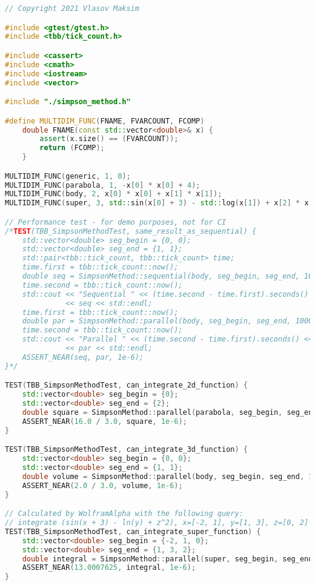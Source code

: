 \documentclass{report}
\begin{document}
\begin{lstlisting}[language=C++]
// Copyright 2021 Vlasov Maksim

#include <gtest/gtest.h>
#include <tbb/tick_count.h>

#include <cassert>
#include <cmath>
#include <iostream>
#include <vector>

#include "./simpson_method.h"

#define MULTIDIM_FUNC(FNAME, FVARCOUNT, FCOMP)                                 \
    double FNAME(const std::vector<double>& x) {                               \
        assert(x.size() == (FVARCOUNT));                                       \
        return (FCOMP);                                                        \
    }

MULTIDIM_FUNC(generic, 1, 0);
MULTIDIM_FUNC(parabola, 1, -x[0] * x[0] + 4);
MULTIDIM_FUNC(body, 2, x[0] * x[0] + x[1] * x[1]);
MULTIDIM_FUNC(super, 3, std::sin(x[0] + 3) - std::log(x[1]) + x[2] * x[2]);

// Performance test - for demo purposes, not for CI
/*TEST(TBB_SimpsonMethodTest, same_result_as_sequential) {
    std::vector<double> seg_begin = {0, 0};
    std::vector<double> seg_end = {1, 1};
    std::pair<tbb::tick_count, tbb::tick_count> time;
    time.first = tbb::tick_count::now();
    double seq = SimpsonMethod::sequential(body, seg_begin, seg_end, 10000000);
    time.second = tbb::tick_count::now();
    std::cout << "Sequential " << (time.second - time.first).seconds() << ' '
              << seq << std::endl;
    time.first = tbb::tick_count::now();
    double par = SimpsonMethod::parallel(body, seg_begin, seg_end, 10000000);
    time.second = tbb::tick_count::now();
    std::cout << "Parallel " << (time.second - time.first).seconds() << ' '
              << par << std::endl;
    ASSERT_NEAR(seq, par, 1e-6);
}*/

TEST(TBB_SimpsonMethodTest, can_integrate_2d_function) {
    std::vector<double> seg_begin = {0};
    std::vector<double> seg_end = {2};
    double square = SimpsonMethod::parallel(parabola, seg_begin, seg_end, 100);
    ASSERT_NEAR(16.0 / 3.0, square, 1e-6);
}

TEST(TBB_SimpsonMethodTest, can_integrate_3d_function) {
    std::vector<double> seg_begin = {0, 0};
    std::vector<double> seg_end = {1, 1};
    double volume = SimpsonMethod::parallel(body, seg_begin, seg_end, 100);
    ASSERT_NEAR(2.0 / 3.0, volume, 1e-6);
}

// Calculated by WolframAlpha with the following query:
// integrate (sin(x + 3) - ln(y) + z^2), x=[-2, 1], y=[1, 3], z=[0, 2]
TEST(TBB_SimpsonMethodTest, can_integrate_super_function) {
    std::vector<double> seg_begin = {-2, 1, 0};
    std::vector<double> seg_end = {1, 3, 2};
    double integral = SimpsonMethod::parallel(super, seg_begin, seg_end, 100);
    ASSERT_NEAR(13.0007625, integral, 1e-6);
}


\end{lstlisting}
\end{document}
